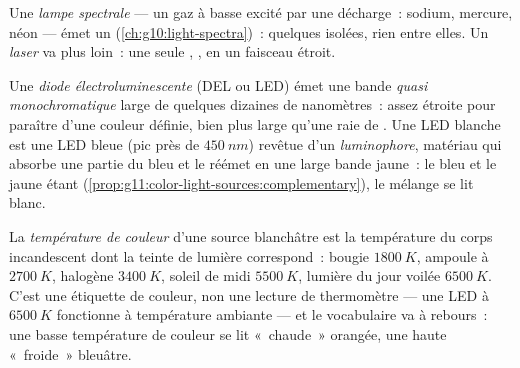 \begin{definition}\label{def:g11:color-light-sources:lamps}
Une \emph{lampe spectrale} --- un gaz à
basse  excité par une décharge~: sodium,
mercure, néon --- émet un 
(\cref{ch:g10:light-spectra})~: quelques
 isolées, rien entre elles. Un
\emph{laser} va plus loin~: une seule
,
, en un faisceau étroit.
\end{definition}

\begin{definition}[LED]\label{def:g11:color-light-sources:led}
Une \emph{diode électroluminescente} (DEL ou LED) émet une bande
\emph{quasi monochromatique} large de
quelques dizaines de nanomètres~: assez étroite pour paraître d'une
couleur définie, bien plus large qu'une raie de
. Une LED blanche est une LED bleue (pic
près de $\qty{450}{nm}$) revêtue d'un
\emph{luminophore}, matériau qui absorbe une partie
du bleu et le réémet en une large bande jaune~: le bleu et le jaune
étant 
(\cref{prop:g11:color-light-sources:complementary}), le mélange se lit
blanc.
\end{definition}

\begin{definition}\label{def:g11:color-light-sources:colortemp}
La \emph{température de couleur} d'une
source blanchâtre est la température du corps incandescent dont la
teinte de lumière correspond~: bougie $\qty{1800}{K}$, ampoule à
 $\qty{2700}{K}$, halogène $\qty{3400}{K}$, soleil de midi
$\qty{5500}{K}$, lumière du jour voilée $\qty{6500}{K}$. C'est une
étiquette de couleur, non une lecture de thermomètre --- une LED à
$\qty{6500}{K}$ fonctionne à température ambiante --- et le vocabulaire
va à rebours~: une basse température de couleur se lit «~chaude~»
orangée, une haute «~froide~» bleuâtre.
\end{definition}

